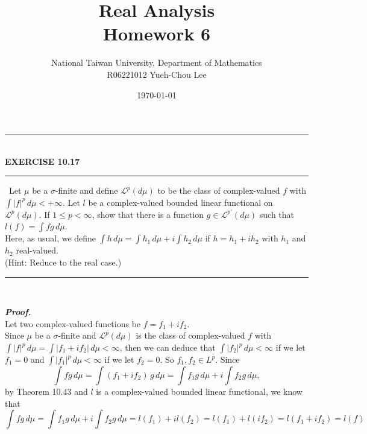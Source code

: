 \documentclass[a4paper,11pt]{article}
\title{Real Analysis\\ Homework 6}
\author{National Taiwan University, Department of Mathematics\\
R06221012 \hspace{0.2cm} Yueh-Chou Lee}
\date{\today}
\begin{document}
\maketitle

	\begin{flushleft}
		\rule[-0.5ex]{17cm}{2pt}\\
			\textbf{EXERCISE 10.17}\\
		\rule[1.5ex]{17cm}{0.5pt}\
			Let $\mu$ be a $\sigma$-finite and define $\mathscr{L}^p(d\mu)$ to be the class of complex-valued $f$ with $\int|f|^p\,d\mu < +\infty$. Let $l$ be a complex-valued bounded linear functional on $\mathscr{L}^p(d\mu)$. If $1 \leq p < \infty$, show that there is a function $g \in \mathscr{L}^{p'}(d\mu)$ such that $l(f) = \int fg\,d\mu$.\\
			Here, as usual, we define $\int h\,d\mu = \int h_1\,d\mu + i\int h_2\,d\mu$ if $h = h_1 + ih_2$ with $h_1$ and $h_2$ real-valued.\\
			(Hint: Reduce to the real case.)
		\rule[1.0ex]{17cm}{0.5pt}\
	\end{flushleft}
	\textit{\textbf {Proof.}}\\
		Let two complex-valued functions be $f = f_1 + if_2$.\\
		Since $\mu$ be a $\sigma$-finite and $\mathscr{L}^p(d\mu)$ is the class of complex-valued $f$ with $\int|f|^p\,d\mu = \int |f_1 + if_2|\,d\mu < \infty$, then we can deduce that $\int |f_2|^p\,d\mu < \infty$ if we let $f_1 = 0$ and $\int |f_1|^p\,d\mu < \infty$ if we let $f_2 = 0$. So $f_1, f_2 \in L^p$. Since
			$$\int fg\,d\mu
			= \int (f_1 + if_2)\,g\,d\mu
			= \int f_1g\,d\mu + i\int f_2g\,d\mu,$$
		by Theorem 10.43 and $l$ is a complex-valued bounded linear functional, we know that
			$$\int fg\,d\mu
			= \int f_1g\,d\mu + i\int f_2g\,d\mu
			= l(f_1) + il(f_2)
			= l(f_1) + l(if_2)
			= l(f_1 + if_2)
			=l(f)$$\\
\end{document}
